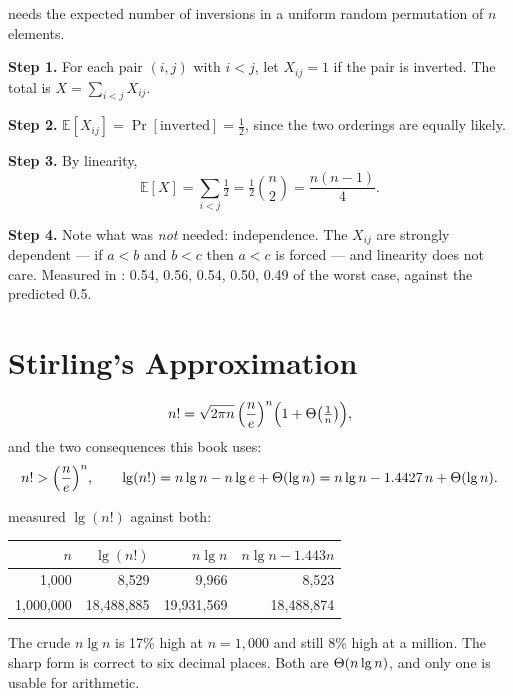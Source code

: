 \begin{worked}
 needs the expected number of inversions in a uniform random
permutation of $n$ elements.

\smallskip
\textbf{Step 1.} For each pair $(i,j)$ with $i<j$, let $X_{ij} = 1$ if the pair
is inverted. The total is $X = \sum_{i<j} X_{ij}$.

\smallskip
\textbf{Step 2.} $\mathbb{E}[X_{ij}] = \Pr[\text{inverted}] = \tfrac12$, since
the two orderings are equally likely.

\smallskip
\textbf{Step 3.} By linearity,
\[ \mathbb{E}[X] = \sum_{i<j} \tfrac12 = \tfrac12\binom{n}{2}
   = \frac{n(n-1)}{4}. \]

\smallskip
\textbf{Step 4.} Note what was \emph{not} needed: independence. The $X_{ij}$
are strongly dependent --- if $a<b$ and $b<c$ then $a<c$ is forced --- and
linearity does not care. Measured in : 0.54, 0.56, 0.54, 0.50,
0.49 of the worst case, against the predicted 0.5.
\end{worked}

\section{Stirling's Approximation}

\begin{definitionbox}[Stirling]
\[ n! = \sqrt{2\pi n}\,\Bigl(\frac{n}{e}\Bigr)^{n}
        \Bigl(1 + \Theta\bigl(\tfrac1n\bigr)\Bigr), \]
and the two consequences this book uses:
\[ n! > \Bigl(\frac{n}{e}\Bigr)^{n}, \qquad
   \operatorname{lg}(n!) = n\operatorname{lg} n - n\operatorname{lg} e + \Theta(\operatorname{lg} n)
           = n \operatorname{lg} n - 1.4427\,n + \Theta(\operatorname{lg} n). \]
\end{definitionbox}

\begin{alertbox}
 measured $\lg(n!)$ against both:

\begin{center}
\begin{tabular}{@{}rrrr@{}}
\toprule
\rowcolor{primary!15}
$n$ & $\lg(n!)$ & $n\lg n$ & $n\lg n - 1.443n$ \\
\midrule
1{,}000     &       8{,}529 &       9{,}966 &       8{,}523 \\
1{,}000{,}000 & 18{,}488{,}885 & 19{,}931{,}569 & 18{,}488{,}874 \\
\bottomrule
\end{tabular}
\end{center}

\smallskip
The crude $n\lg n$ is 17\% high at $n = 1{,}000$ and still 8\% high at a
million. The sharp form is correct to six decimal places. Both are
$\Theta(n\operatorname{lg} n)$, and only one is usable for arithmetic.
\end{alertbox}

